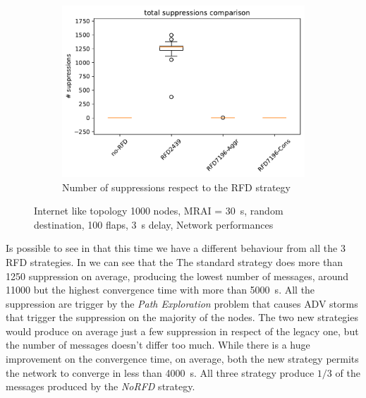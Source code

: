 \begin{figure}[h]
\begin{subfigure}[b]{0.325\textwidth}
     \end{subfigure}
     \hfill
     \begin{subfigure}[b]{0.325\textwidth}
         \centering
         \includegraphics[width=\textwidth]{images/RFD/miceVSelephants/elephants/cisco_1000MRAI30_rfd_comparison_suppressions_boxplot.pdf}
         \caption{Number of suppressions respect to the RFD strategy}
         \label{fig:1000_RFD_MRAI_30_suppressions_elephant}
     \end{subfigure}
		\caption{Internet like topology \num{1000} nodes, \ac{MRAI} = \SI{30}{\second}, random destination, \num{100} flaps, \SI{3}{\second} delay, Network performances}
        \label{fig:1000_RFD_MRAI_30_elephant}
\end{figure}

Is possible to see in  that this time we have
a different behaviour from all the \num{3} \ac{RFD} strategies.
In  we can see that the
The standard strategy does more than \num{1250} suppression on average, producing 
the lowest number of messages, around \num{11000} but the highest convergence
time with more than \SI{5000}{\second}.
All the suppression are trigger by the \textit{Path Exploration} problem that 
causes \ac{ADV} storms that trigger the suppression on the majority
of the nodes.
The two new strategies would produce on average just a few suppression in respect
of the legacy one, but the number of messages doesn't differ too much.
While there is a huge improvement on the convergence time, on average,
both the new strategy permits the network to converge in less than \SI{4000}{\second}.
All three strategy produce $1/3$ of the messages produced by the 
\textit{NoRFD} strategy.

